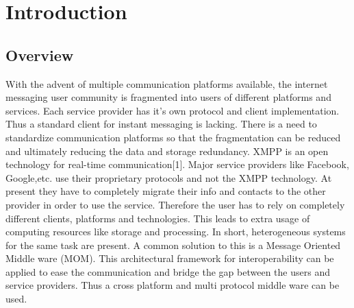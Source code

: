 \documentclass{SureshLimkar}
\begin{document}
\maketitlepage %

\newpage

\makecertipage %

\newpage



\newpage



\newpage

\makeackpage %

\newpage

\makeabstrpage %

\tableofcontents

\listoffigures

\listoftables

\chapter{Introduction}
\section{Overview}
\hspace{0.5 in}With the advent of multiple communication platforms available, the internet messaging user community is fragmented into users of different platforms and services. Each service provider has it's own protocol and client implementation. Thus a standard client for instant messaging is lacking.  There is a need to standardize communication platforms so that the fragmentation can be reduced and ultimately reducing the data and storage redundancy.  XMPP is an open technology for real-time communication[1]. Major service providers like Facebook, Google,etc. use their proprietary protocols and not the XMPP technology. At present they have to completely migrate their info and contacts to the other provider in order to use the service. Therefore the user has to rely on completely different clients, platforms and technologies. This leads to extra usage of computing resources like storage and processing. In short, heterogeneous systems for the same task are present. A common solution to this is a Message Oriented Middle ware (MOM). This architectural framework for interoperability can be applied to ease the communication and bridge the gap between the users and service providers. Thus a cross platform and multi protocol middle ware can be used.
\hspace{0.5 in} 
\end{document}
